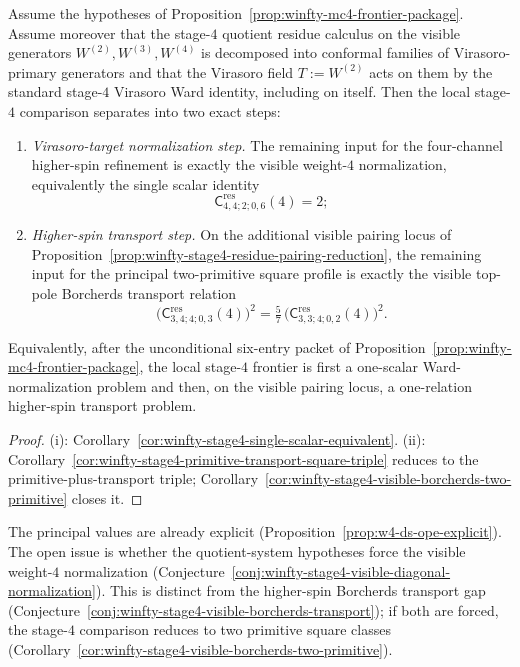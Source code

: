 \begin{proposition}
\label{prop:winfty-stage4-local-attack-order}
Assume the hypotheses of
Proposition~\ref{prop:winfty-mc4-frontier-package}.  Assume moreover
that the stage-$4$ quotient residue calculus on the visible generators
\(W^{(2)},W^{(3)},W^{(4)}\) is decomposed into conformal families of
Virasoro-primary generators and that the Virasoro field \(T:=W^{(2)}\)
acts on them by the standard stage-$4$ Virasoro Ward identity,
including on itself.  Then the local stage-$4$ comparison separates
into two exact steps:
\begin{enumerate}[label=\textup{(\roman*)}]
\item \emph{Virasoro-target normalization step.}
  The remaining input for the four-channel higher-spin refinement is
  exactly the visible weight-$4$ normalization, equivalently the single
  scalar identity
  \[
  \mathsf{C}^{\mathrm{res}}_{4,4;2;0,6}(4)=2;
  \]
\item \emph{Higher-spin transport step.}
  On the additional visible pairing locus of
  Proposition~\ref{prop:winfty-stage4-residue-pairing-reduction}, the
  remaining input for the principal two-primitive square profile is
  exactly the visible top-pole Borcherds transport relation
  \[
  \bigl(\mathsf{C}^{\mathrm{res}}_{3,4;4;0,3}(4)\bigr)^2
  =
  \tfrac{5}{7}\,
  \bigl(\mathsf{C}^{\mathrm{res}}_{3,3;4;0,2}(4)\bigr)^2.
  \]
\end{enumerate}
Equivalently, after the unconditional six-entry packet of
Proposition~\ref{prop:winfty-mc4-frontier-package}, the local
stage-$4$ frontier is first a one-scalar Ward-normalization problem and
then, on the visible pairing locus, a one-relation higher-spin
transport problem.
\end{proposition}

\begin{proof}
\textup{(i)}: Corollary~\ref{cor:winfty-stage4-single-scalar-equivalent}.  \textup{(ii)}: Corollary~\ref{cor:winfty-stage4-primitive-transport-square-triple} reduces to the primitive-plus-transport triple; Corollary~\ref{cor:winfty-stage4-visible-borcherds-two-primitive} closes it.
\end{proof}

\begin{remark}
The principal values are already explicit (Proposition~\ref{prop:w4-ds-ope-explicit}).  The open issue is whether the quotient-system hypotheses force the visible weight-$4$ normalization (Conjecture~\ref{conj:winfty-stage4-visible-diagonal-normalization}).  This is distinct from the higher-spin Borcherds transport gap (Conjecture~\ref{conj:winfty-stage4-visible-borcherds-transport}); if both are forced, the stage-$4$ comparison reduces to two primitive square classes (Corollary~\ref{cor:winfty-stage4-visible-borcherds-two-primitive}).
\end{remark}

